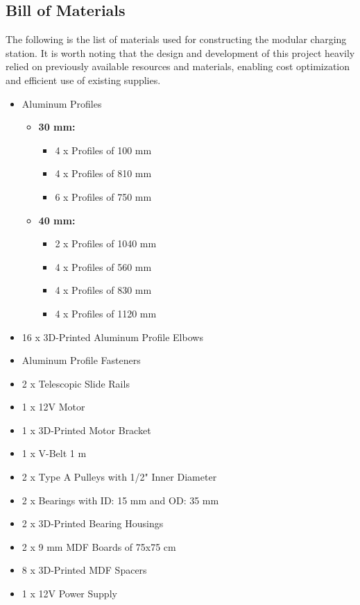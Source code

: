 \subsection{Bill of Materials}
The following is the list of materials used for constructing the modular charging station. It is worth noting that the design and development of this project heavily relied on previously available resources and materials, enabling cost optimization and efficient use of existing supplies.
\begin{itemize}
    \item Aluminum Profiles
        \begin{itemize}
            \item \textbf{30 mm:}
            \begin{itemize}
            \item 4 x Profiles of 100 mm
            \item 4 x Profiles of 810 mm
            \item 6 x Profiles of 750 mm
            \end{itemize}
            \item \textbf{40 mm:}
            \begin{itemize}
            \item 2 x Profiles of 1040 mm
            \item 4 x Profiles of 560 mm
            \item 4 x Profiles of 830 mm
            \item 4 x Profiles of 1120 mm
            \end{itemize}
        \end{itemize}
    \item 16 x 3D-Printed Aluminum Profile Elbows
    \item Aluminum Profile Fasteners
    \item 2 x Telescopic Slide Rails
    \item 1 x 12V Motor
    \item 1 x 3D-Printed Motor Bracket
    \item 1 x V-Belt 1 m
    \item 2 x Type A Pulleys with 1/2" Inner Diameter
    \item 2 x Bearings with ID: 15 mm and OD: 35 mm
    \item 2 x 3D-Printed Bearing Housings
    \item 2 x 9 mm MDF Boards of 75x75 cm
    \item 8 x 3D-Printed MDF Spacers
    \item 1 x 12V Power Supply

\end{itemize}
